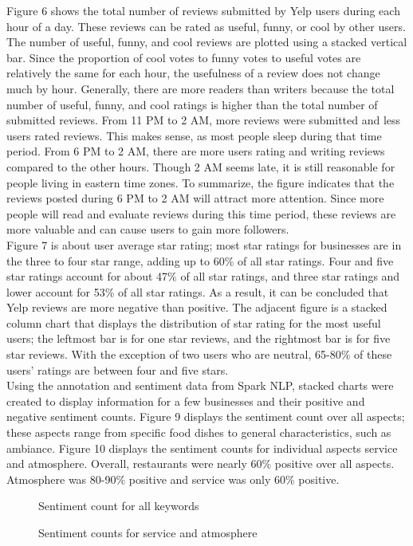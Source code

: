 \documentclass[11pt,journal,compsoc]{IEEEtran}
\begin{document}
\indent Figure 6 shows the total number of reviews submitted by Yelp users during each hour of a day. These reviews can be rated as useful, funny, or cool by other users. The number of useful, funny, and cool reviews are plotted using a stacked vertical bar. Since the proportion of cool votes to funny votes to useful votes are relatively the same for each hour, the usefulness of a review does not change much by hour. Generally, there are more readers than writers because the total number of useful, funny, and cool ratings is higher than the total number of submitted reviews. From 11 PM to 2 AM, more reviews were submitted and less users rated reviews. This makes sense, as most people sleep during that time period. From 6 PM to 2 AM, there are more users rating and writing reviews compared to the other hours. Though 2 AM seems late, it is still reasonable for people living in eastern time zones. To summarize, the figure indicates that the reviews posted during 6 PM to 2 AM will attract more attention. Since more people will read and evaluate reviews during this time period, these reviews are more valuable and can cause users to gain more followers. \\
\indent Figure 7 is about user average star rating; most star ratings for businesses are in the three to four star range, adding up to 60\% of all star ratings. Four and five star ratings account for about 47\% of all star ratings, and three star ratings and lower account for 53\% of all star ratings. As a result, it can be concluded that Yelp reviews are more negative than positive. The adjacent figure is a stacked column chart that displays the distribution of star rating for the most useful users; the leftmost bar is for one star reviews, and the rightmost bar is for five star reviews. With the exception of two users who are neutral, 65-80\% of these users’ ratings are between four and five stars. \\
\indent Using the annotation and sentiment data from Spark NLP, stacked charts were created to display information for a few businesses and their positive and negative sentiment counts. Figure 9 displays the sentiment count over all aspects; these aspects range from specific food dishes to general characteristics, such as ambiance. Figure 10 displays the sentiment counts for individual aspects service and atmosphere. Overall, restaurants were nearly 60\% positive over all aspects. Atmosphere was 80-90\% positive and service was only 60\% positive. \\
\begin{figure*}[!t]
\centering
{}
\caption{Sentiment count for all keywords}
\label{fig_sim}
\end{figure*}
\begin{figure*}[!t]
\centering
{}
\hfil
{}
\caption{Sentiment counts for service and atmosphere}
\label{fig_sim}
\end{figure*}
\end{document}
